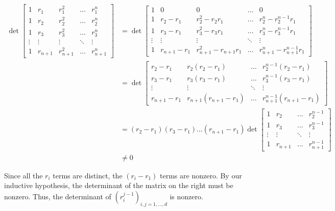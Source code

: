 \documentclass{report}
\begin{document}
\begin{align*}
    \det \begin{bmatrix}
        1 & r_1 & r_1^2 & \hdots & r_1^n \\
        1 & r_2 & r_2^2 & \hdots & r_2^n \\
        1 & r_3 & r_3^2 & \hdots & r_3^n \\
        \vdots & \vdots & \vdots & \ddots & \vdots \\
        1 & r_{n+1} & r_{n+1}^2 & \hdots & r_{n+1}^n
    \end{bmatrix}
    &= \det \begin{bmatrix}
        1 & 0 & 0  & \hdots & 0 \\
        1 & r_2 - r_1 & r_2^2 - r_2r_1& \hdots & r_2^n - r_2^{n-1}r_1 \\
        1 & r_3 - r_1 & r_3^2  - r_3r_1& \hdots & r_3^n - r_3^{n-1}r_1 \\
        \vdots & \vdots & \vdots & \ddots & \vdots \\
        1 & r_{n+1} - r_1 & r_{n+1}^2  - r_{n+1}r_1& \hdots & r_{n+1}^n -  r_{n+1}^{n-1}r_1
    \end{bmatrix} \\
    &= \det \begin{bmatrix}
        r_2 - r_1 & r_2(r_2 - r_1)& \hdots & r_2^{n-1}(r_2 - r_1) \\
        r_3 - r_1 & r_3(r_3 - r_1)& \hdots & r_3^{n-1}(r_3 - r_1) \\
        \vdots & \vdots & \ddots & \vdots \\
        r_{n+1} - r_1 & r_{n+1}(r_{n+1} - r_1)& \hdots & r_{n+1}^{n-1}(r_{n+1} - r_1)
    \end{bmatrix} \\
    &= (r_2 - r_1)(r_3-r_1)\hdots(r_{n+1}-r_1)
    \det \begin{bmatrix}
        1 & r_2 & \hdots & r_2^{n-1} \\
        1 & r_3 & \hdots & r_3^{n-1} \\
        \vdots & \vdots & \ddots & \vdots \\
        1 & r_{n+1}& \hdots & r_{n+1}^{n-1}
    \end{bmatrix} \\
    &\neq 0
\end{align*}

Since all the $r_i$ terms are distinct, the $(r_i-r_1)$ terms are nonzero.
By our inductive hypothesis, the determinant of the matrix on the right must be nonzero.
Thus, the determinant of $(r_i^{j-1})_{i,j=1,\hdots,d}$ is nonzero. \\
\end{document}
